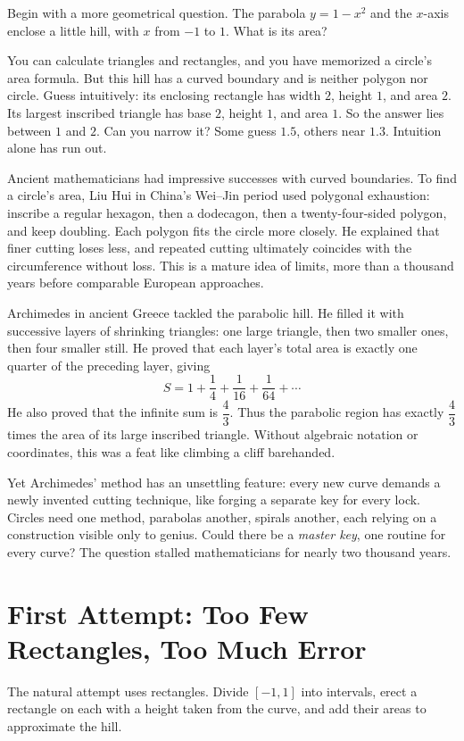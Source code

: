 Begin with a more geometrical question. The parabola $y=1-x^{2}$ and the $x$-axis enclose a little hill, with $x$ from $-1$ to $1$. What is its area?

You can calculate triangles and rectangles, and you have memorized a circle's area formula. But this hill has a curved boundary and is neither polygon nor circle. Guess intuitively: its enclosing rectangle has width $2$, height $1$, and area $2$. Its largest inscribed triangle has base $2$, height $1$, and area $1$. So the answer lies between $1$ and $2$. Can you narrow it? Some guess $1.5$, others near $1.3$. Intuition alone has run out.

Ancient mathematicians had impressive successes with curved boundaries. To find a circle's area, Liu Hui in China's Wei--Jin period used polygonal exhaustion: inscribe a regular hexagon, then a dodecagon, then a twenty-four-sided polygon, and keep doubling. Each polygon fits the circle more closely. He explained that finer cutting loses less, and repeated cutting ultimately coincides with the circumference without loss. This is a mature idea of limits, more than a thousand years before comparable European approaches.

Archimedes in ancient Greece tackled the parabolic hill. He filled it with successive layers of shrinking triangles: one large triangle, then two smaller ones, then four smaller still. He proved that each layer's total area is exactly one quarter of the preceding layer, giving
\[
S=1+\frac14+\frac1{16}+\frac1{64}+\cdots
\]
He also proved that the infinite sum is $\dfrac43$. Thus the parabolic region has exactly $\dfrac43$ times the area of its large inscribed triangle. Without algebraic notation or coordinates, this was a feat like climbing a cliff barehanded.

Yet Archimedes' method has an unsettling feature: every new curve demands a newly invented cutting technique, like forging a separate key for every lock. Circles need one method, parabolas another, spirals another, each relying on a construction visible only to genius. Could there be a \emph{master key}, one routine for every curve? The question stalled mathematicians for nearly two thousand years.

\section{First Attempt: Too Few Rectangles, Too Much Error}

The natural attempt uses rectangles. Divide $[-1,1]$ into intervals, erect a rectangle on each with a height taken from the curve, and add their areas to approximate the hill.


